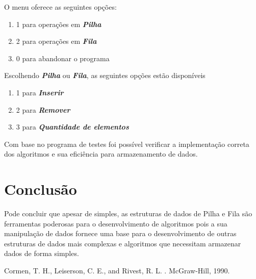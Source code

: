 \documentclass[rascunho,xindy,sublist]{fei}
\begin{document}
O menu oferece as seguintes opções:

\begin{enumerate}
  \item 1 para operações em \textbf{\textit{Pilha}}
  \item 2 para operações em \textbf{\textit{Fila}}
  \item 0 para abandonar o programa
\end{enumerate}

Escolhendo \textbf{\textit{Pilha}} ou \textbf{\textit{Fila}}, as seguintes opções estão disponíveis

\begin{enumerate}
  \item 1 para \textbf{\textit{Inserir}}
  \item 2 para \textbf{\textit{Remover}}
  \item 3 para \textbf{\textit{Quantidade de elementos}}
\end{enumerate}

Com base no programa de testes foi possível verificar a implementação correta dos algoritmos e sua eficiência para armazenamento de dados.

\chapter{Conclusão}

Pode concluir que apesar de simples, as estruturas de dados de Pilha e Fila são ferramentas poderosas para o desenvolvimento de algoritmos pois a sua manipulação de dados fornece uma base para o desenvolvimento de outras estruturas de dados mais complexas e algoritmos que necessitam armazenar dados de forma simples.


\printindex

\begin{thebibliography}{9}

{Cormen, T. H.}, {Leiserson, C. E.}, and {Rivest, R. L.}
.
\newblock McGraw-Hill, 1990.

\end{thebibliography}
\end{document}
